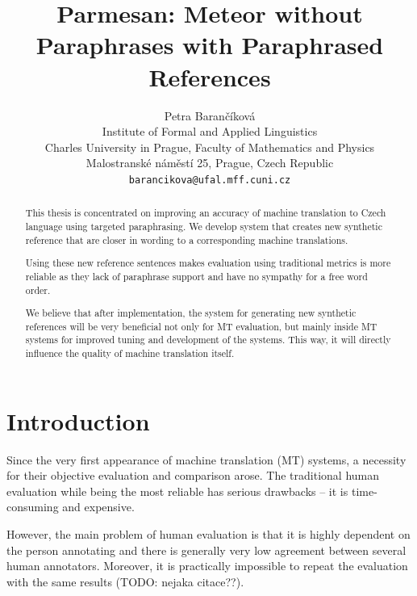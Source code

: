 \documentclass[11pt]{article}
\title{Parmesan: Meteor without Paraphrases with Paraphrased References}
\author{Petra Barančíková \\
  Institute of Formal and Applied Linguistics \\
  Charles University in Prague, Faculty of Mathematics and Physics\\
  Malostranské náměstí 25, Prague, Czech Republic \\
  {\tt barancikova@ufal.mff.cuni.cz} \\}
\date{}
\begin{document}
\maketitle
\begin{abstract}
This thesis is concentrated on improving an accuracy of machine translation to 
Czech language using targeted paraphrasing. We develop system that creates new
synthetic reference that are closer in wording to a corresponding machine 
translations. 

Using these new reference sentences makes evaluation using traditional metrics 
is more reliable as they lack of paraphrase support and have no sympathy for a 
free word order.

We believe that after implementation, the system for generating new synthetic
references will be very beneficial not only for MT evaluation, but mainly
inside MT systems for improved tuning and development of the systems. This way,
it will directly influence the quality of machine translation itself.

\end{abstract}

\section{Introduction}
Since the very first appearance of machine translation (MT) systems, a 
necessity for their objective evaluation and comparison arose. The traditional
human evaluation while being the most reliable has serious drawbacks -- it is 
time-consuming and expensive.

However, the main problem of human evaluation is that it is highly dependent on 
the person annotating and there is generally very low agreement between several 
human annotators. %
Moreover, it is practically impossible to repeat the evaluation with the same
results (TODO: nejaka citace??).
\end{document}
